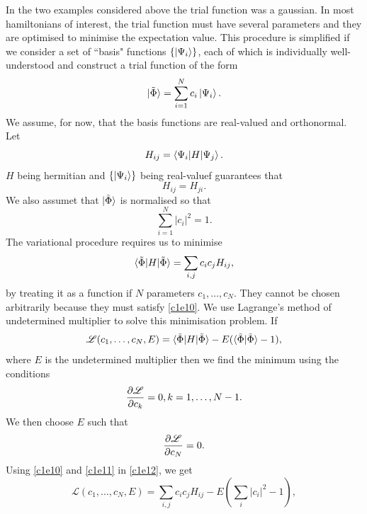 In the two examples considered above the trial function was a gaussian. In most
hamiltonians of interest, the trial function must have several parameters and 
they are optimised to minimise the expectation value. This procedure is 
simplified if we consider a set of ``basis" functions $\{\ket{\Psi_i}\}$, each 
of which is individually well-understood and construct a trial function of the 
form
\begin{equation}\label{c1e7}
\ket{\tilde{\Phi}} = \sum_{i=1}^N c_i\ket{\Psi_i}.
\end{equation}
We assume, for now, that the basis functions are real-valued and orthonormal.
Let
\begin{equation}\label{c1e8}
H_{ij} = \braket{\Psi_i|H|\Psi_j}.
\end{equation}
$H$ being hermitian and $\{\ket{\Psi_i}\}$ being real-valuef guarantees
that
\begin{equation}\label{c1e9}
H_{ij} = H_{ji}.
\end{equation}
We also assumet that $\ket{\tilde{\Phi}}$ is normalised so that
\begin{equation}\label{c1e10}
\sum_{i=1}^N |c_i|^2 = 1.
\end{equation}
The variational procedure requires us to minimise
\begin{equation}\label{c1e11}
\braket{\tilde{\Phi}|H|\tilde{\Phi}} = \sum_{i,j}c_ic_jH_{ij},
\end{equation}
by treating it as a function if $N$ parameters $c_1, \ldots, c_N$. They cannot
be chosen arbitrarily because they must satisfy \eqref{c1e10}. We use Lagrange's
method of undetermined multiplier to solve this minimisation problem. If
\begin{equation}\label{c1e12}
\mathscr{L}(c_1, \ldots, c_N, E) = \braket{\tilde{\Phi}|H|\tilde{\Phi}} 
- E(\braket{\tilde{\Phi}|\tilde{\Phi}} - 1),
\end{equation}
where $E$ is the undetermined multiplier then we find the minimum using the
conditions
\begin{equation}\label{c1e13}
\frac{\partial{\mathscr{L}}}{\partial{c_k}} = 0, k = 1, \ldots, N - 1.
\end{equation}
We then choose $E$ such that
\begin{equation}\label{c1e14}
\frac{\partial{\mathscr{L}}}{\partial{c_N}} = 0.
\end{equation}
Using \eqref{c1e10} and \eqref{c1e11} in \eqref{c1e12}, we get
\begin{equation}\label{c1e15}
\mathscr{L}(c_1, \ldots, c_N, E) = \sum_{i,j}c_ic_jH_{ij} - E\left(\sum_i|c_i|^2
- 1\right),
\end{equation}
